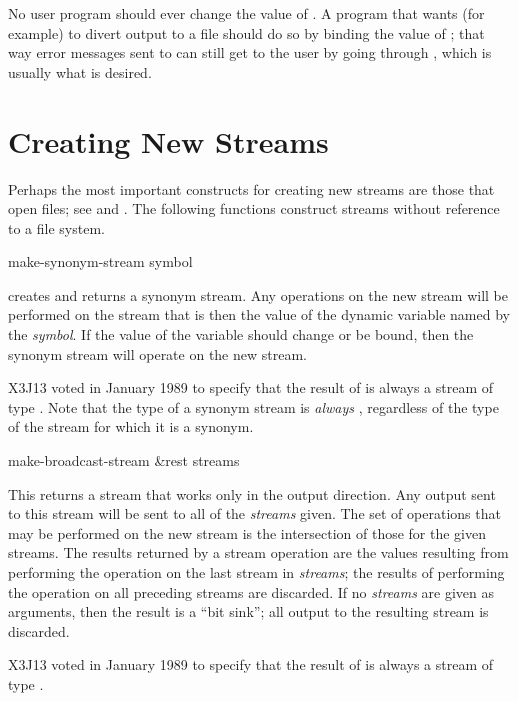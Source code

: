 No user program should ever change the value of .  A program
that wants (for example) to divert output to a file should do so by binding
the value of ; that way error messages sent to
 can still get to the user by going through ,
which is usually what is desired.

\section {Creating New Streams}

Perhaps the most important constructs for creating new streams
are those that open files; see  and .
The following functions construct streams without reference to a file system.

\begin{defun}[Function]
make-synonym-stream symbol

 creates and returns
a synonym stream.
Any operations on the new stream will be performed on the stream
that is then the value of the dynamic variable named by the {\it symbol}.
If the value of the variable should change or be bound,
then the synonym stream will operate on the new stream.

\begin{new}
X3J13 voted in January 1989
to specify that the result of
 is always a stream of type .
Note that the type of a synonym stream is {\it always} ,
regardless of the type of the stream for which it is a synonym.
\end{new}
\end{defun}

\begin{defun}[Function]
make-broadcast-stream &rest streams

This returns a stream that works only in the output direction.  Any output
sent to this stream will be sent to all of the {\it streams} given.
The set of
operations that may be performed on the new stream is the intersection
of those for the given streams.  The results returned by a stream
operation are the values resulting from
performing the operation on the last stream in {\it streams}; the
results of performing the operation on all preceding streams are
discarded.
If no {\it streams} are given as arguments, then the result
is a ``bit sink''; all output to the resulting stream is discarded.

\begin{new}
X3J13 voted in January 1989
to specify that the result of
 is always a stream of type .
\end{new}
\end{defun}

